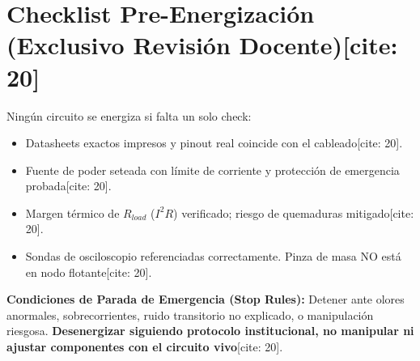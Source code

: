 \documentclass[11pt, a4paper]{article}
\begin{document}
\section*{Checklist Pre-Energización (Exclusivo Revisión Docente)[cite: 20]}
Ningún circuito se energiza si falta un solo check:
\begin{itemize}
    \item[$\square$] Datasheets exactos impresos y pinout real coincide con el cableado[cite: 20].
    \item[$\square$] Fuente de poder seteada con límite de corriente y protección de emergencia probada[cite: 20].
    \item[$\square$] Margen térmico de $R_{load}$ ($I^2 R$) verificado; riesgo de quemaduras mitigado[cite: 20].
    \item[$\square$] Sondas de osciloscopio referenciadas correctamente. Pinza de masa NO está en nodo flotante[cite: 20].
\end{itemize}

\textbf{Condiciones de Parada de Emergencia (Stop Rules):} Detener ante olores anormales, sobrecorrientes, ruido transitorio no explicado, o manipulación riesgosa. \textbf{Desenergizar siguiendo protocolo institucional, no manipular ni ajustar componentes con el circuito vivo}[cite: 20].
\end{document}
